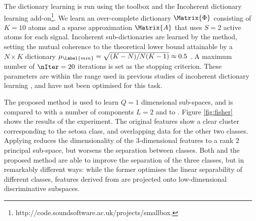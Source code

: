 \documentclass{article}
\def \nComponents{L} 	%
\def \nDim{N} 			%
\def \Dic{\Matrix{\Phi}} %
\def \nAto{K} 			%
\def \Coeff{\Matrix{A}} 	%
\def \nActiveAtoms{S} 	%
\def \nDimSub{Q}
\begin{document}
The dictionary learning is run using the  toolbox and the Incoherent dictionary learning add-on\footnote{http://code.soundsoftware.ac.uk/projects/smallbox.}. We learn an over-complete dictionary $\Dic$ consisting of $\nAto=10$ atoms and a sparse approximation $\Coeff$ that uses $\nActiveAtoms=2$ active atoms for each signal. Incoherent sub-dictionaries are learned by the  method, setting the mutual coherence to the theoretical lower bound attainable by a $\nDim\times \nAto$ dictionary $\mu_{\Label{min}} = \sqrt{(\nAto-\nDim)/\nDim(\nAto-1)}\approx 0.5$ \cite{Strohmer2003Gr}. A maximum number of $\nIter=20$ iterations is set as the stopping criterion. These parameters are within the range used in previous studies of incoherent dictionary learning \cite{Barchiesi2013Le}, and have not been optimised for this task.

The proposed method is used to learn $\nDimSub=1$ dimensional sub-spaces, and is  compared to  with a number of components $\nComponents=2$ and to . Figure \ref{fig:fisher} shows the results of the experiment. The original features show a clear cluster corresponding to the setosa class, and overlapping data for the other two classes. Applying  reduces the dimensionality of the $3$-dimensional features to a rank $2$ principal sub-space, but worsens the separation between classes. Both  and the proposed method are able to improve the separation of the three classes, but in remarkably different ways: while the former optimises the linear separability of different classes, features derived from  are projected onto low-dimensional discriminative subspaces.
\end{document}
